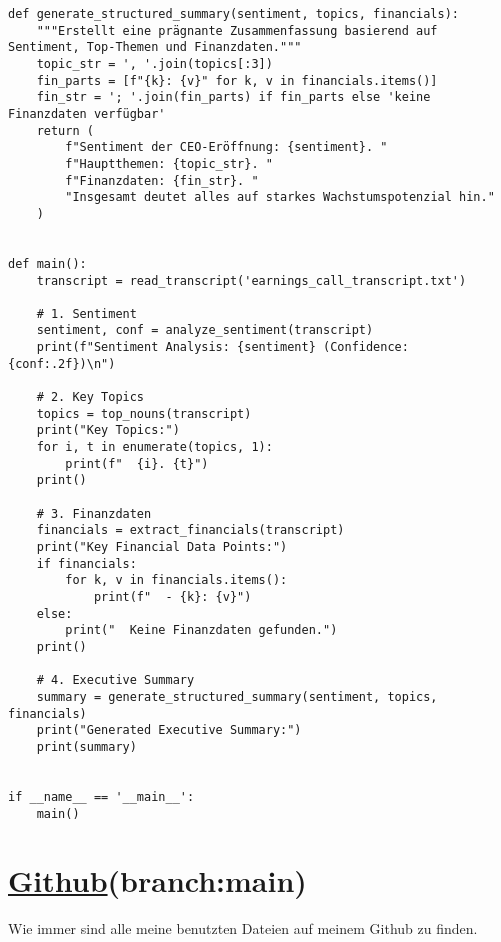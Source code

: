 \documentclass[a4paper,12pt]{scrartcl}
\begin{document}
\begin{lstlisting}[style=mypythonstyle,caption={analysis.py mit Sentiment-, Topic- und Finanzanalyse}]
def generate_structured_summary(sentiment, topics, financials):
    """Erstellt eine prägnante Zusammenfassung basierend auf Sentiment, Top-Themen und Finanzdaten."""
    topic_str = ', '.join(topics[:3])
    fin_parts = [f"{k}: {v}" for k, v in financials.items()]
    fin_str = '; '.join(fin_parts) if fin_parts else 'keine Finanzdaten verfügbar'
    return (
        f"Sentiment der CEO-Eröffnung: {sentiment}. "
        f"Hauptthemen: {topic_str}. "
        f"Finanzdaten: {fin_str}. "
        "Insgesamt deutet alles auf starkes Wachstumspotenzial hin."
    )


def main():
    transcript = read_transcript('earnings_call_transcript.txt')

    # 1. Sentiment
    sentiment, conf = analyze_sentiment(transcript)
    print(f"Sentiment Analysis: {sentiment} (Confidence: {conf:.2f})\n")

    # 2. Key Topics
    topics = top_nouns(transcript)
    print("Key Topics:")
    for i, t in enumerate(topics, 1):
        print(f"  {i}. {t}")
    print()

    # 3. Finanzdaten
    financials = extract_financials(transcript)
    print("Key Financial Data Points:")
    if financials:
        for k, v in financials.items():
            print(f"  - {k}: {v}")
    else:
        print("  Keine Finanzdaten gefunden.")
    print()

    # 4. Executive Summary
    summary = generate_structured_summary(sentiment, topics, financials)
    print("Generated Executive Summary:")
    print(summary)


if __name__ == '__main__':
    main()
\end{lstlisting}

\section*{\href{https://github.com/7hands/Angewandte-Modellierung-25-Colmant}{Github}(branch:main)}
Wie immer sind alle meine benutzten Dateien auf meinem Github zu finden. 
\end{document}
